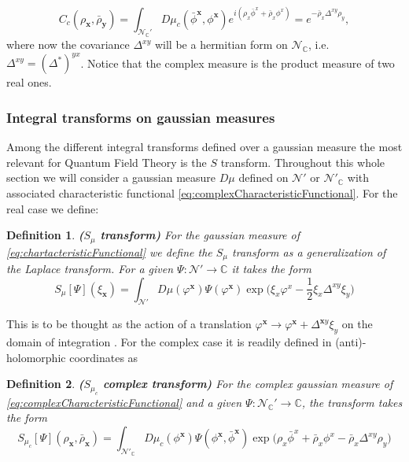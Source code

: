 \documentclass[12pt]{article}%
\newtheorem{definition}{Definition}%
\begin{document}
\begin{equation}
\label{eq:complexCharacteristicFunctional}
C_c(\rho_{\mathbf{x}},\bar\rho_{\mathbf{y}})=\int_{\mathcal{N}_{\mathbb{C}}'}D\mu_c(\bar \phi^{\mathbf{x}}, \phi^{\mathbf{x}}) e^{i({\rho_x\bar{\phi}^x+\bar\rho_x{\phi}^x})} =e^{-\bar{\rho}_x\Delta^{xy}\rho_y},
\end{equation}
where now the covariance $\Delta^{xy}$ will be a hermitian form on $\mathcal{N}_\mathbb{C}$, i.e. $\Delta^{xy}=(\Delta^*)^{yx}$. 
Notice that the complex measure is the product measure of two real ones.

\subsubsection{Integral transforms on gaussian measures}
Among the different integral transforms defined over a gaussian measure the most relevant for Quantum Field Theory is the $S$ transform. Throughout this whole section we will consider a gaussian measure $D\mu$ defined on $\mathcal{N}'$ or $\mathcal{N}'_\mathbb{C}$ with associated characteristic functional \eqref{eq:complexCharacteristicFunctional}. For the real case we define:

\begin{definition}
    \label{def:Stransform}{\bf ($S_\mu$ transform)} For the  gaussian measure of \eqref{eq:chartacteristicFunctional} we define the $S_\mu$ transform as a generalization of the Laplace transform. For a given $\Psi:\mathcal{N}'\to \mathbb{C}$ it takes the form 
    \begin{equation}
        \label{eq:stransform}
        S_\mu[\Psi](\xi_\mathbf{x})=\int_{\mathcal{N}'}D\mu(\varphi^{\mathbf{x}})\Psi(\varphi^{\mathbf{x}})\exp{\big(\xi_x\varphi^x-\frac12\xi_x\Delta^{xy}\xi_y\big)}
\end{equation}
\end{definition}
This is to be thought as the action of a translation $\varphi^{\mathbf{x}}\to\varphi^{\mathbf{x}}+\Delta^{\mathbf{x}y}\xi_y$ on the domain of integration . For the complex case it is readily defined in (anti)-holomorphic coordinates as 

\begin{definition}
    \label{def:SComplextransform}{\bf ($S_{\mu_c}$ complex transform)} For the complex gaussian measure of \eqref{eq:complexCharacteristicFunctional} and a given $\Psi:\mathcal{N}_{\mathbb{C}}'\to \mathbb{C}$, the transform takes the form 
    \begin{equation}
        \label{eq:stransformcomplex}
        S_{\mu_c}[\Psi](\rho_\mathbf{x},\bar\rho_\mathbf{x})=\int_{\mathcal{N}'_{\mathbb{C}}}D\mu_c(\phi^{\mathbf{x}})\Psi(\phi^{\mathbf{x}},\bar\phi^{\mathbf{x}})\exp{\big({\rho}_x\bar\phi^x+\bar{\rho}_x{\phi}^x-\bar\rho_x\Delta^{xy}\rho_y\big)}
        \end{equation}
\end{definition}
\end{document}
